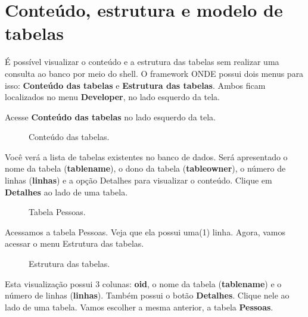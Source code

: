 \documentclass[9pt]{report}
\begin{document}
{    \section{Conteúdo, estrutura e modelo de tabelas}
    
    É possível visualizar o conteúdo e a estrutura das tabelas sem
    realizar uma consulta ao banco por meio do shell. O framework
    ONDE possui dois menus para isso: \textbf{Conteúdo das tabelas} e
    \textbf{Estrutura das tabelas}. Ambos ficam localizados no menu
    \textbf{Developer}, no lado esquerdo da tela.

    Acesse \textbf{Conteúdo das tabelas} no lado esquerdo da tela.

    \begin{figure}[H]
     \caption{Conteúdo das tabelas.}
     \label{fig:conttabelas}
    \end{figure}

    Você verá a lista de tabelas existentes no banco de dados. Será
    apresentado o nome da tabela (\textbf{tablename}), o dono da
    tabela (\textbf{tableowner}), o número de linhas
    (\textbf{linhas}) e a opção Detalhes para visualizar o conteúdo.
    Clique em \textbf{Detalhes} ao lado de uma tabela.
    
    \begin{figure}[H]
     \caption{Tabela Pessoas.}
     \label{fig:conttabelapes}
    \end{figure}

    Acessamos a tabela Pessoas. Veja que ela possui uma(1) linha.
    Agora, vamos acessar o menu Estrutura das tabelas.

    \begin{figure}[H]
     \caption{Estrutura das tabelas.}
     \label{fig:estruturatabelas}
    \end{figure}

    Esta visualização possui 3 colunas: \textbf{oid}, o nome da
    tabela (\textbf{tablename}) e o número de linhas
    (\textbf{linhas}). Também possui o botão \textbf{Detalhes}.
    Clique nele ao lado de uma tabela. Vamos escolher a mesma
    anterior, a tabela \textbf{Pessoas}.

}
\end{document}

